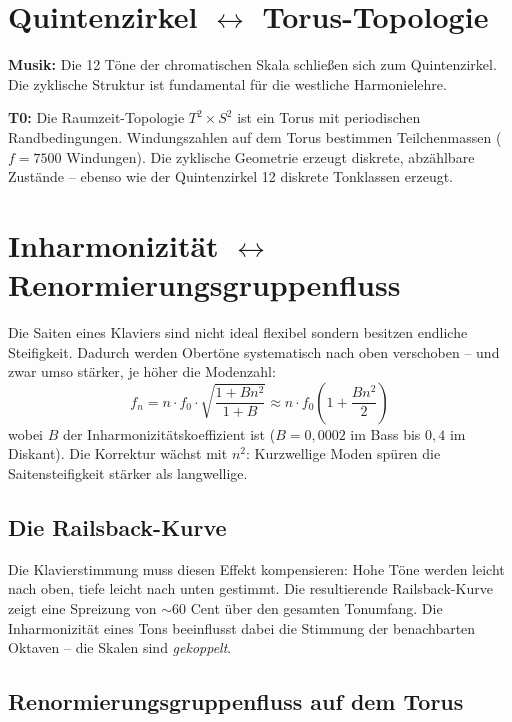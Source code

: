 \section{\texorpdfstring{Quintenzirkel $\leftrightarrow$ Torus-Topologie}{Quintenzirkel -- Torus-Topologie}}

\textbf{Musik:} Die 12 Töne der chromatischen Skala schließen sich zum Quintenzirkel. Die zyklische Struktur ist fundamental für die westliche Harmonielehre.

\textbf{T0:} Die Raumzeit-Topologie $T^2 \times S^2$ ist ein Torus mit periodischen Randbedingungen. Windungszahlen auf dem Torus bestimmen Teilchenmassen ($f = 7500$ Windungen). Die zyklische Geometrie erzeugt diskrete, abzählbare Zustände -- ebenso wie der Quintenzirkel 12 diskrete Tonklassen erzeugt.

\section{\texorpdfstring{Inharmonizität $\leftrightarrow$ Renormierungsgruppenfluss}{Inharmonizität -- Renormierungsgruppenfluss}}

Die Saiten eines Klaviers sind nicht ideal flexibel sondern besitzen endliche Steifigkeit. Dadurch werden Obertöne systematisch nach oben verschoben -- und zwar umso stärker, je höher die Modenzahl:
\begin{equation}
	f_n = n \cdot f_0 \cdot \sqrt{\frac{1 + B n^2}{1 + B}} \approx n \cdot f_0 \left(1 + \frac{B n^2}{2}\right)
\end{equation}
wobei $B$ der Inharmonizitätskoeffizient ist ($B = 0{,}0002$ im Bass bis $0{,}4$ im Diskant). Die Korrektur wächst mit $n^2$: Kurzwellige Moden spüren die Saitensteifigkeit stärker als langwellige.

\subsection{Die Railsback-Kurve}

Die Klavierstimmung muss diesen Effekt kompensieren: Hohe Töne werden leicht nach oben, tiefe leicht nach unten gestimmt. Die resultierende Railsback-Kurve zeigt eine Spreizung von $\sim$60 Cent über den gesamten Tonumfang. Die Inharmonizität eines Tons beeinflusst dabei die Stimmung der benachbarten Oktaven -- die Skalen sind \emph{gekoppelt}.

\subsection{Renormierungsgruppenfluss auf dem Torus}

